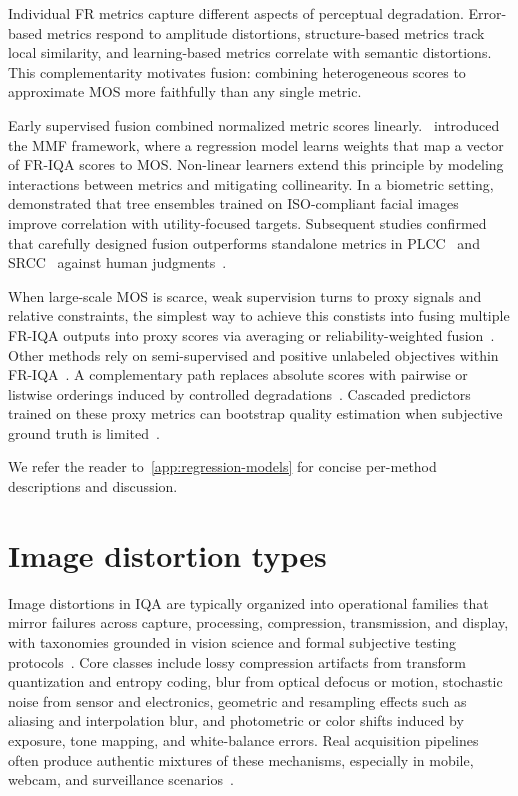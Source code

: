Individual \acs{FR} metrics capture different aspects of perceptual degradation. Error-based metrics respond to amplitude distortions, structure-based metrics track local similarity, and learning-based metrics correlate with semantic distortions. This complementarity motivates fusion: combining heterogeneous scores to approximate \acs{MOS} more faithfully than any single metric.

Early supervised fusion combined normalized metric scores linearly.~\cite{liu2012fusion} introduced the \acf{MMF} framework, where a regression model learns weights that map a vector of \acs{FR-IQA} scores to \acs{MOS}. Non-linear learners extend this principle by modeling interactions between metrics and mitigating collinearity. In a biometric setting,~\cite{henniger2020assessment} demonstrated that tree ensembles trained on \acs{ISO}-compliant facial images improve correlation with utility-focused targets. Subsequent studies confirmed that carefully designed fusion outperforms standalone metrics in \acf{PLCC}~\cite{plcc} and \acf{SRCC}~\cite{srcc} against human judgments~\cite{babnik2022bias}.

When large-scale \acs{MOS} is scarce, weak supervision turns to proxy signals and relative constraints, the simplest way to achieve this constists into fusing multiple \acs{FR-IQA} outputs into proxy scores via averaging or reliability-weighted fusion~\cite{lai2022pseudomos}. Other methods rely on semi-supervised and positive unlabeled objectives within \acs{FR-IQA}~\cite{cao2022semisupervied}. A complementary path replaces absolute scores with pairwise or listwise orderings induced by controlled degradations~\cite{liu2017rankiqa}. Cascaded predictors trained on these proxy metrics can bootstrap quality estimation when subjective ground truth is limited~\cite{wu2020cascaded}.

We refer the reader to~\autoref{app:regression-models} for concise per-method descriptions and discussion.

\section{Image distortion types}\label{sec:distortions}

Image distortions in \acs{IQA} are typically organized into operational families that mirror failures across capture, processing, compression, transmission, and display, with taxonomies grounded in vision science and formal subjective testing protocols~\cite{survey2006wang,survey2020zhai,ma2025survey,itu2023r}. Core classes include lossy compression artifacts from transform quantization and entropy coding, blur from optical defocus or motion, stochastic noise from sensor and electronics, geometric and resampling effects such as aliasing and interpolation blur, and photometric or color shifts induced by exposure, tone mapping, and white-balance errors. Real acquisition pipelines often produce authentic mixtures of these mechanisms, especially in mobile, webcam, and surveillance scenarios~\cite{kamble2015nriqa,dost2022rriqa,survey2017aquisition}.

